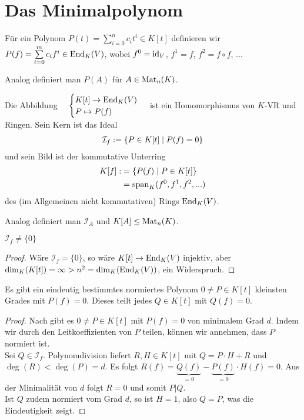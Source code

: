 \section{Das Minimalpolynom}

\begin{definition}
	Für ein Polynom $P(t)=\sum\limits_{i=0}^n c_it^i\in K[t]$ definieren wir $P(f)=\sum\limits_{i=0}^m c_if^i\in\operatorname{End}_K(V)$, wobei $f^0=\operatorname{id}_V$, $f^1=f$, $f^2=f\circ f$, ...
	
	Analog definiert man $P(A)$ für $A\in\operatorname{Mat}_n(K)$.
\end{definition}

\begin{remark}
	Die Abbildung $\quad\begin{cases}K[t]\to \operatorname{End}_K(V)\\ P\mapsto P(f)\end{cases}$ ist ein Homomorphismus von $K$-VR und Ringen. Sein Kern ist das Ideal 
	\begin{align}
		\mathcal{I}_f:=\{P\in K[t]\mid P(f)=0\}\notag
	\end{align}
	und sein Bild ist der kommutative Unterring 
	\begin{align}
		K[f]:&=\{P(f)\mid P\in K[t]\}\notag \\
		&= \operatorname{span}_K(f^0,f^1,f^2,...)\notag
	\end{align}
	des (im Allgemeinen nicht kommutativen) Rings $\operatorname{End}_K(V)$.
	
	Analog definiert man $\mathcal{I}_A$ und $K[A]\le \operatorname{Mat}_n(K)$.
\end{remark}

\begin{lemma}
	$\mathcal{I}_f\neq\{0\}$
\end{lemma}
\begin{proof}
	Wäre $\mathcal{I}_f=\{0\}$, so wäre $K[t]\to \operatorname{End}_K(V)$ injektiv, aber $\dim_K(K[t])= \infty>n^2=\dim_K(\operatorname{End}_K(V))$, ein Widerspruch.
\end{proof}

\begin{proposition}
	Es gibt ein eindeutig bestimmtes normiertes Polynom $0\neq P\in K[t]$ kleinsten Grades mit $P(f)=0$. Dieses teilt jedes $Q\in K[t]$ mit $Q(f)=0$.
\end{proposition}
\begin{proof}
	Nach  gibt es $0\neq P\in K[t]$ mit $P(f)=0$ von minimalem Grad $d$. Indem wir durch den Leitkoeffizienten von $P$ teilen, können wir annehmen, dass $P$ normiert ist. \\
	Sei $Q\in\mathcal{I}_f$. Polynomdivision liefert $R,H\in K[t]$ mit $Q=P\cdot H+R$ und $\deg(R)<\deg(P)=d$. Es folgt $R(f)=\underbrace{Q(f)}_{=0}-\underbrace{P(f)}_{=0}\cdot H(f)=0$. Aus der Minimalität von $d$ folgt $R=0$ und somit $P\vert Q$. \\
	Ist $Q$ zudem normiert vom Grad $d$, so ist $H=1$, also $Q=P$, was die Eindeutigkeit zeigt.
\end{proof}

